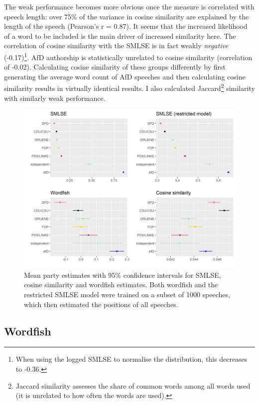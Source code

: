\documentclass{article}
\begin{document}
The weak performance becomes more obvious once the measure is correlated with speech length: over 75\% of the variance in cosine similarity are explained by the length of the speech (Pearson's r = 0.87). It seems that the increased likelihood of a word to be included is the main driver of increased similarity here. The correlation of cosine similarity with the SMLSE is in fact weakly \textit{negative} (-0.17)\footnote{When using the logged SMLSE to normalise the distribution, this decreases to -0.36.}. AfD authorship is statistically unrelated to cosine similarity (correlation of -0.02). Calculating cosine similarity of these groups differently by first generating the average word count of AfD speeches and then calculating cosine similarity results in virtually identical results. I also calculated Jaccard\footnote{Jaccard similarity assesses the share of common words among all words used (it is unrelated to how often the words are used).} similarity with similarly weak performance.\par

\begin{figure}
    \centering
    \includegraphics[width = \textwidth]{DE/vis/similarity_pts.jpg}
    \caption{Mean party estimates with 95\% confidence intervals for SMLSE, cosine similarity and wordfish estimates. Both wordfish and the restricted SMLSE model were trained on a subset of 1000 speeches, which then estimated the positions of all speeches.}
    \label{fig:comp}
\end{figure}

\subsection{Wordfish}
\end{document}
